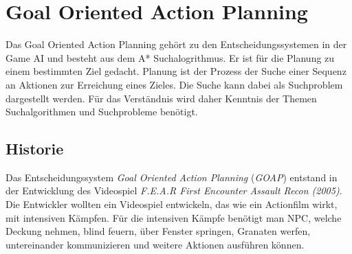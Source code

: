 \chapter{Goal Oriented Action Planning}

Das Goal Oriented Action Planning gehört zu den Entscheidungssystemen in der Game AI und besteht aus dem A* Suchalogrithmus. Er ist für die Planung zu einem bestimmten Ziel gedacht. Planung ist der Prozess der Suche einer Sequenz an Aktionen zur Erreichung eines Zieles. Die Suche kann dabei als Suchproblem dargestellt werden. Für das Verständnis wird daher Kenntnis der Themen Suchalgorithmen und Suchprobleme benötigt.


\section{Historie}

Das Entscheidungssystem \textit{Goal Oriented Action Planning} (\textit{GOAP}) entstand in der Entwicklung des Videospiel \textit{F.E.A.R First Encounter Assault Recon (2005)}. Die Entwickler wollten ein Videospiel entwickeln, das wie ein Actionfilm wirkt, mit intensiven Kämpfen. Für die intensiven Kämpfe benötigt man NPC, welche Deckung nehmen, blind feuern, über Fenster springen, Granaten werfen, untereinander kommunizieren und weitere Aktionen ausführen können.

